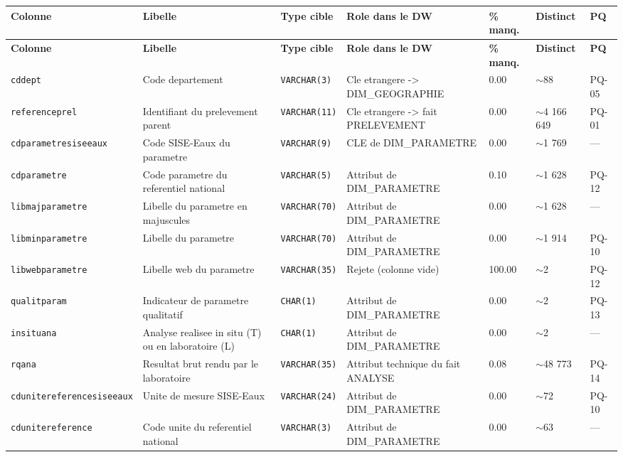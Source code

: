 {\footnotesize\setlength{\tabcolsep}{3pt}
\begin{longtable}{@{}p{2.6cm}p{3.5cm}p{1.9cm}p{3.1cm}p{1.1cm}p{1.3cm}p{0.9cm}@{}}
\toprule
\textbf{Colonne} & \textbf{Libelle} & \textbf{Type cible} & \textbf{Role dans le DW} & \textbf{\% manq.} & \textbf{Distinct} & \textbf{PQ} \\
\midrule \endfirsthead
\toprule \textbf{Colonne} & \textbf{Libelle} & \textbf{Type cible} & \textbf{Role dans le DW} & \textbf{\% manq.} & \textbf{Distinct} & \textbf{PQ} \\ \midrule \endhead
\bottomrule \endfoot
\texttt{cddept} & Code departement & \texttt{VARCHAR(3)} & Cle etrangere -> DIM\_GEOGRAPHIE & 0.00 & $\sim$88 & PQ-05 \\
\texttt{referenceprel} & Identifiant du prelevement parent & \texttt{VARCHAR(11)} & Cle etrangere -> fait PRELEVEMENT & 0.00 & $\sim$4 166 649 & PQ-01 \\
\texttt{cdparametresiseeaux} & Code SISE-Eaux du parametre & \texttt{VARCHAR(9)} & CLE de DIM\_PARAMETRE & 0.00 & $\sim$1 769 & --- \\
\texttt{cdparametre} & Code parametre du referentiel national & \texttt{VARCHAR(5)} & Attribut de DIM\_PARAMETRE & 0.10 & $\sim$1 628 & PQ-12 \\
\texttt{libmajparametre} & Libelle du parametre en majuscules & \texttt{VARCHAR(70)} & Attribut de DIM\_PARAMETRE & 0.00 & $\sim$1 628 & --- \\
\texttt{libminparametre} & Libelle du parametre & \texttt{VARCHAR(70)} & Attribut de DIM\_PARAMETRE & 0.00 & $\sim$1 914 & PQ-10 \\
\texttt{libwebparametre} & Libelle web du parametre & \texttt{VARCHAR(35)} & Rejete (colonne vide) & 100.00 & $\sim$2 & PQ-12 \\
\texttt{qualitparam} & Indicateur de parametre qualitatif & \texttt{CHAR(1)} & Attribut de DIM\_PARAMETRE & 0.00 & $\sim$2 & PQ-13 \\
\texttt{insituana} & Analyse realisee in situ (T) ou en laboratoire (L) & \texttt{CHAR(1)} & Attribut de DIM\_PARAMETRE & 0.00 & $\sim$2 & --- \\
\texttt{rqana} & Resultat brut rendu par le laboratoire & \texttt{VARCHAR(35)} & Attribut technique du fait ANALYSE & 0.08 & $\sim$48 773 & PQ-14 \\
\texttt{cdunitereferencesiseeaux} & Unite de mesure SISE-Eaux & \texttt{VARCHAR(24)} & Attribut de DIM\_PARAMETRE & 0.00 & $\sim$72 & PQ-10 \\
\texttt{cdunitereference} & Code unite du referentiel national & \texttt{VARCHAR(3)} & Attribut de DIM\_PARAMETRE & 0.00 & $\sim$63 & --- \\

\end{longtable}}

